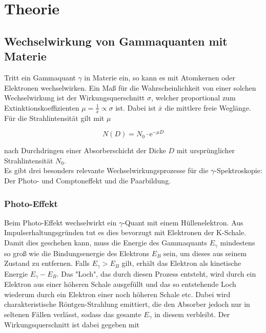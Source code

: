 \section{Theorie}
\label{sec:Theorie}

\subsection{Wechselwirkung von Gammaquanten mit Materie}

Tritt ein Gammaquant $\gamma$ in Materie ein, so kann es mit Atomkernen oder Elektronen wechselwirken. Ein Maß für die Wahrscheinlichkeit von 
einer solchen Wechselwirkung ist der Wirkungsquerschnitt $\sigma$, welcher proportional zum Extinktionskoeffizienten $\mu = \frac{1}{\bar{x}} \propto \sigma$
ist. Dabei ist $\bar{x}$ die mittlere freie Weglänge. Für die Strahlintensität gilt mit $\mu$

\begin{equation}
    N\left(D\right) = N_0 \cdot \text{e}^{-\mu D}
    \label{eqn:Strahl}
\end{equation}

nach Durchdringen einer Absorberschicht der Dicke $D$ mit ursprünglicher Strahlintensität $N_0$.\\

Es gibt drei besonders relevante Wechselwirkungsprozesse für die $\gamma$-Spektroskopie: Der Photo- und Comptoneffekt und die Paarbildung.

\subsubsection{Photo-Effekt}

Beim Photo-Effekt wechselwirkt ein $\gamma$-Quant mit einem Hüllenelektron. Aus Impulserhaltungsgründen tut es dies bevorzugt mit Elektronen der 
K-Schale. Damit dies geschehen kann, muss die Energie des Gammaquants $E_\gamma$ mindestens so groß wie die Bindungsenergie des Elektrons $E_B$ sein, 
um dieses aus seinem Zustand zu entfernen. Falls $E_\gamma > E_B$ gilt, erhält das Elektron als kinetische Energie $E_\gamma - E_B$. Das "Loch", 
das durch diesen Prozess entsteht, wird durch ein Elektron aus einer höheren Schale ausgefüllt und das so entstehende Loch wiederum durch ein 
Elektron einer noch höheren Schale etc. Dabei wird charakteristische Röntgen-Strahlung emittiert, die den Absorber jedoch nur in seltenen 
Fällen verlässt, sodass das gesamte $E_\gamma$ in diesem verbleibt. Der Wirkungsquerschnitt ist dabei gegeben mit 

